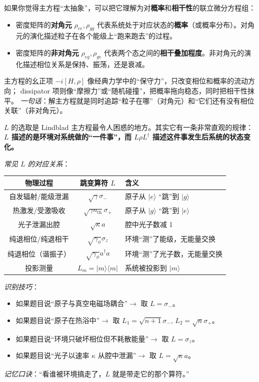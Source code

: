 \begin{tipbox}[密度矩阵的演化到底在算什么？]
如果你觉得主方程``太抽象''，可以把它理解为对\textbf{概率}和\textbf{相干性}的联立微分方程组：
\begin{itemize}[nosep]
    \item 密度矩阵的\textbf{对角元} $\rho_{ee}, \rho_{gg}$ 代表系统处于对应状态的\textbf{概率}（或概率分布）。对角元的演化描述粒子在各个能级上``跑来跑去''的过程。
    \item 密度矩阵的\textbf{非对角元} $\rho_{eg}, \rho_{ge}$ 代表两个态之间的\textbf{相干叠加程度}。非对角元的演化描述相位关系是保持、振荡，还是衰减。
\end{itemize}
主方程的幺正项 $-i[H,\rho]$ 像经典力学中的``保守力''，只改变相位和概率的流动方向； dissipator 项则像``摩擦力''或``随机碰撞''，把概率拖向稳态，同时把相干性抹平。
\textit{一句话}：解主方程就是同时追踪``粒子在哪''（对角元）和``它们还有没有相位关联''（非对角元）。
\end{tipbox}

\begin{tipbox}
$L$ 的选取是 Lindblad 主方程最令人困惑的地方。其实它有一条非常直观的规律：\textbf{$L$ 描述的是环境对系统做的``一件事''，而 $L\rho L^\dagger$ 描述这件事发生后系统的状态变化。}

\textit{常见 $L$ 的对应关系}：
\begin{center}
\renewcommand{\arraystretch}{1.4}
\begin{tabular}{|c|c|l|}
\hline
\textbf{物理过程} & \textbf{跳变算符 $L$} & \textbf{含义} \\
\hline
自发辐射/能级泄漏 & $\sqrt{\gamma}\sigma_-$ & 原子从 $|e\rangle$ ``跳''到 $|g\rangle$ \\
\hline
热激发/受激吸收 & $\sqrt{\gamma n_{\text{th}}}\sigma_+$ & 原子从 $|g\rangle$ ``跳''到 $|e\rangle$ \\
\hline
光子泄漏出腔 & $\sqrt{\kappa}a$ & 腔中光子数减 1 \\
\hline
纯退相位/纯退相干 & $\sqrt{\gamma_\phi}\sigma_z$ & 环境``测''了能级，无能量交换 \\
\hline
纯退相位（谐振子） & $\sqrt{\gamma_\phi}a^\dagger a$ & 环境``测''了光子数，无能量交换 \\
\hline
投影测量 & $L_m = |m\rangle\langle m|$ & 系统被投影到 $|m\rangle$ \\
\hline
\end{tabular}
\end{center}

\textit{识别技巧}：
\begin{itemize}[nosep]
    \item 如果题目说``原子与真空电磁场耦合''$\to$ 取 $L=\sigma_-$。
    \item 如果题目说``原子在热浴中''$\to$ 取 $L_1=\sqrt{n+1}\sigma_-$, $L_2=\sqrt{n}\sigma_+$。
    \item 如果题目说``环境只破坏相位但不耗散能量''$\to$ 取 $L=\sigma_z$。
    \item 如果题目说``光子以速率 $\kappa$ 从腔中泄漏''$\to$ 取 $L=\sqrt{\kappa}a$。
\end{itemize}
\textit{记忆口诀}：``看谁被环境搞走了，$L$ 就是带走它的那个算符。''
\end{tipbox}

